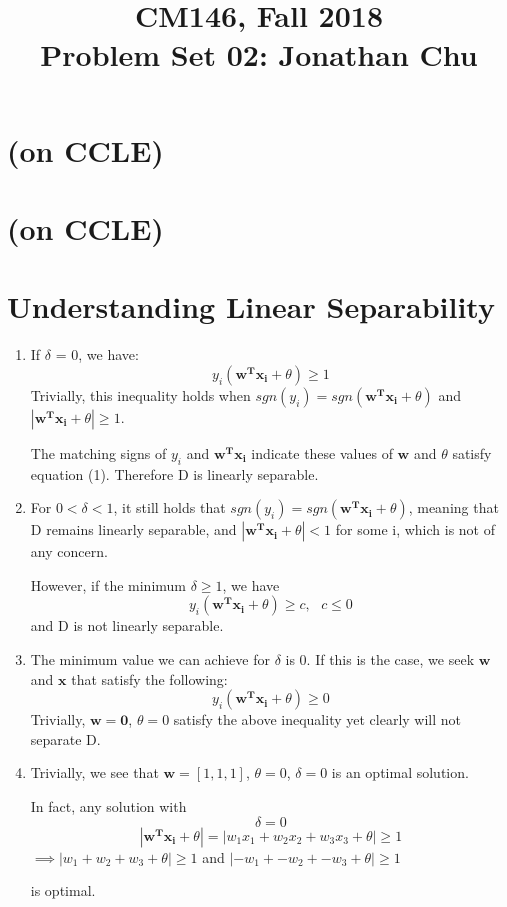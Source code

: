 \documentclass[11pt]{article}
\newcommand{\cnum}{CM146}
\newcommand{\ced}{Fall 2018}
\newcommand{\ctitle}[3]{\title{\vspace{-0.5in}\cnum, \ced\\Problem Set #1: #2}}
\newcommand{\solution}[1]{{{\color{black}{\bf Solution:} {#1}}}}
\begin{document}
\ctitle{02}{Jonathan Chu}
\date{}
\maketitle
\vspace{-0.75in}

\section{(on CCLE)}
\section{(on CCLE)}

\section{Understanding Linear Separability}
\begin{enumerate}
\item %
\solution{
If $\delta$ = 0, we have:
$$y_i(\boldsymbol{w^Tx_i}+\theta) \geq 1$$
Trivially, this inequality holds when $sgn(y_i) = sgn(\boldsymbol{w^Tx_i}+\theta)$ and $|\boldsymbol{w^Tx_i}+\theta| \geq 1$.

The matching signs of $y_i$ and $\boldsymbol{w^Tx_i}$ indicate these values of $\boldsymbol{w}$ and $\theta$ satisfy equation (1). Therefore D is linearly separable.
}

\item %
\solution{
For $0 < \delta < 1$, it still holds that $sgn(y_i) = sgn(\boldsymbol{w^Tx_i}+\theta)$, meaning that D remains linearly separable, and $|\boldsymbol{w^Tx_i}+\theta| < 1$ for some i, which is not of any concern.

However, if the minimum $\delta \geq 1$, we have
$$y_i(\boldsymbol{w^Tx_i}+\theta) \geq c, \text{ } c \leq 0$$
and D is not linearly separable.
}

\item %
\solution{
The minimum value we can achieve for $\delta$ is 0. If this is the case, we seek $\boldsymbol{w}$ and $\boldsymbol{x}$ that satisfy the following:
$$y_i(\boldsymbol{w^Tx_i}+\theta) \geq 0$$
Trivially, $\boldsymbol{w} = \boldsymbol{0}$, $\theta = 0$ satisfy the above inequality yet clearly will not separate D.
}

\item %
\solution{
Trivially, we see that $\boldsymbol{w}=[1, 1, 1]$, $\theta=0$, $\delta=0$ is an optimal solution.

In fact, any solution with 
$$\delta = 0$$ 
$$|\boldsymbol{w^Tx_i}+\theta| = |w_1x_1 + w_2x_2 + w_3x_3 + \theta| \geq 1$$
$\implies |w_1 + w_2 + w_3 + \theta| \geq 1$ and $|-w_1 + -w_2 + -w_3 + \theta| \geq 1$

is optimal.
}
\end{enumerate}
\end{document}
